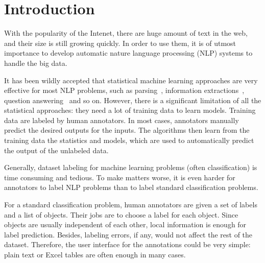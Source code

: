 \section{Introduction}

With the popularity of the Intenet, there are huge amount of text in
the web, and their size is still growing quickly. In order to use
them, it is of utmost importance to develop automatic nature language
processing (NLP) systems to handle the big data. 


It has been wildly accepted that statistical machine learning
approaches are very effective for most NLP problems, such as
parsing~\cite{klein2003accurate}, information
extractions~\cite{banko2007open}, question
answering~\cite{kwok2001scaling} and so on. However, there is a
significant limitation of all the statistical approaches: they need a
lot of training data to learn models. Training data are labeled by
human annotators. In most cases, annotators manually predict the
desired outputs for the inputs. The algorithms then learn from the
training data the statistics and models, which are used to
automatically predict the output of the unlabeled data.   

Generally, dataset labeling for machine learning problems (often
classification) is time consuming and tedious. To make matters worse,
it is even harder for annotators to label NLP problems than to label
standard classification problems.

For a standard classification
problem, human annotators are given a set of labels and a list of
objects. Their jobs are to choose a label for each object. Since
objects are usually independent of each other, local information is
enough for label prediction. Besides, labeling errors, if any, would not
affect the rest of the dataset. Therefore, the user interface for the
annotations could be very simple: plain text or Excel tables are often
enough in many cases. 


